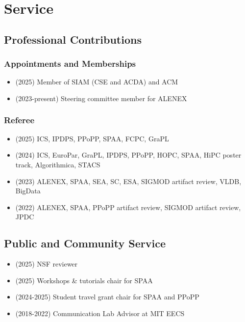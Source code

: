 \section{Service}
\begin{adjustwidth}{2em}{0pt}

\subsection{Professional Contributions}

\subsubsection{Appointments and Memberships}

\begin{itemize}
    \item (2025) Member of SIAM (CSE and ACDA) and ACM
    \item (2023-present) Steering committee member for ALENEX
\end{itemize}

\subsubsection{Referee}

\begin{itemize}
    \item (2025) ICS, IPDPS, PPoPP, SPAA, FCPC, GraPL
    \item (2024) ICS, EuroPar, GraPL, IPDPS, PPoPP, HOPC, SPAA, HiPC poster
    track, Algorithmica, STACS
    \item (2023) ALENEX, SPAA, SEA, SC, ESA, SIGMOD artifact review, VLDB, BigData
    \item (2022) ALENEX, SPAA, PPoPP artifact review, SIGMOD artifact review,
    JPDC
\end{itemize}

\subsection{Public and Community Service}

\begin{itemize}
\item (2025) NSF reviewer
 \item (2025) Workshops \& tutorials chair for SPAA
 \item (2024-2025) Student travel grant chair for SPAA and PPoPP
    \item (2018-2022) Communication Lab Advisor at MIT EECS
\end{itemize}


\end{adjustwidth}
